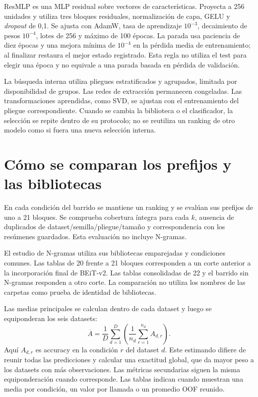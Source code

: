 ResMLP es una MLP residual sobre vectores de características. Proyecta a 256 unidades y utiliza tres bloques residuales, normalización de capa, GELU y \emph{dropout} de 0,1. Se ajusta con AdamW, tasa de aprendizaje \(10^{-3}\), decaimiento de pesos \(10^{-4}\), lotes de 256 y máximo de 100 épocas. La parada usa paciencia de diez épocas y una mejora mínima de \(10^{-4}\) en la pérdida media de entrenamiento; al finalizar restaura el mejor estado registrado. Esta regla no utiliza el test para elegir una época y no equivale a una parada basada en pérdida de validación.

La búsqueda interna utiliza pliegues estratificados y agrupados, limitada por disponibilidad de grupos. Las redes de extracción permanecen congeladas. Las transformaciones aprendidas, como SVD, se ajustan con el entrenamiento del pliegue correspondiente. Cuando se cambia la biblioteca o el clasificador, la selección se repite dentro de su protocolo; no se reutiliza un ranking de otro modelo como si fuera una nueva selección interna.

\section{Cómo se comparan los prefijos y las bibliotecas}
En cada condición del barrido se mantiene un ranking y se evalúan sus prefijos de uno a 21 bloques. Se comprueba cobertura íntegra para cada \(k\), ausencia de duplicados de dataset/semilla/pliegue/tamaño y correspondencia con los resúmenes guardados. Esta evaluación no incluye N-gramas.

El estudio de N-gramas utiliza sus bibliotecas emparejadas y condiciones comunes. Las tablas de 20 frente a 21 bloques corresponden a un corte anterior a la incorporación final de BEiT-v2. Las tablas consolidadas de 22 y el barrido sin N-gramas responden a otro corte. La comparación no utiliza los nombres de las carpetas como prueba de identidad de bibliotecas.

Las medias principales se calculan dentro de cada dataset y luego se equiponderan los seis datasets:
\begin{equation}
\overline A=\frac{1}{D}\sum_{d=1}^{D}
\left(\frac{1}{n_d}\sum_{r=1}^{n_d}A_{d,r}\right).
\label{eq:tk-aggregation}
\end{equation}
Aquí \(A_{d,r}\) es accuracy en la condición \(r\) del dataset \(d\). Este estimando difiere de reunir todas las predicciones y calcular una exactitud global, que da mayor peso a los datasets con más observaciones. Las métricas secundarias siguen la misma equiponderación cuando corresponde. Las tablas indican cuando muestran una media por condición, un valor por llamada o un promedio OOF reunido.

